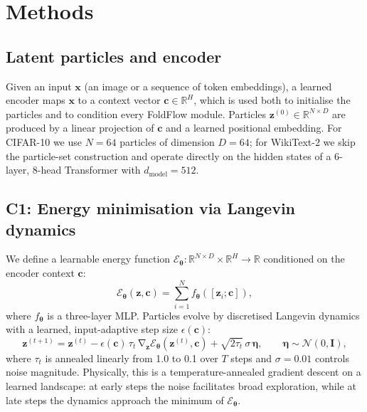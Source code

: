\documentclass[fleqn,10pt]{article}
\newcommand{\R}{\mathbb{R}}
\newcommand{\E}{\mathcal{E}}
\newcommand{\bz}{\mathbf{z}}
\newcommand{\bx}{\mathbf{x}}
\newcommand{\bc}{\mathbf{c}}
\newcommand{\btheta}{\boldsymbol{\theta}}
\DeclareMathOperator{\grad}{\nabla}
\begin{document}
\section*{Methods}
\label{sec:methods}

\subsection*{Latent particles and encoder}

Given an input $\bx$ (an image or a sequence of token embeddings),
a learned encoder maps $\bx$ to a context vector $\bc \in \R^{H}$,
which is used both to initialise the particles and to condition
every FoldFlow module. Particles
$\bz^{(0)} \in \R^{N \times D}$ are produced by a linear projection
of $\bc$ and a learned positional embedding. For CIFAR-10 we use
$N=64$ particles of dimension $D=64$; for WikiText-2 we skip the
particle-set construction and operate directly on the hidden states
of a 6-layer, 8-head Transformer with $d_\text{model}=512$.

\subsection*{C1: Energy minimisation via Langevin dynamics}

We define a learnable energy function
$\E_{\btheta} : \R^{N \times D} \times \R^{H} \to \R$ conditioned on
the encoder context $\bc$:
\begin{equation}
  \E_{\btheta}(\bz, \bc) = \sum_{i=1}^{N}
    f_{\btheta}\left([\bz_i; \bc]\right),
\label{eq:energy}
\end{equation}
where $f_{\btheta}$ is a three-layer MLP. Particles evolve by
discretised Langevin dynamics with a learned, input-adaptive step
size $\epsilon(\bc)$:
\begin{equation}
  \bz^{(t+1)} = \bz^{(t)}
    - \epsilon(\bc) \, \tau_t \, \grad_{\bz} \E_{\btheta}(\bz^{(t)}, \bc)
    + \sqrt{2\tau_t}\,\sigma\,\boldsymbol{\eta},
  \qquad \boldsymbol{\eta} \sim \mathcal{N}(0, \mathbf{I}),
\label{eq:langevin}
\end{equation}
where $\tau_t$ is annealed linearly from 1.0 to 0.1 over $T$ steps
and $\sigma = 0.01$ controls noise magnitude. Physically, this is a
temperature-annealed gradient descent on a learned landscape: at
early steps the noise facilitates broad exploration, while at late steps
the dynamics approach the minimum of $\E_{\btheta}$.
\end{document}
